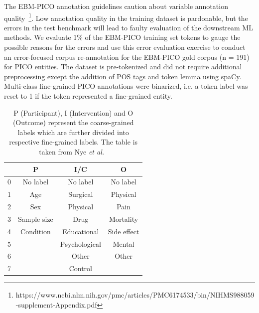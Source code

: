 \documentclass[10.7pt,]{article}
\begin{document}
The EBM-PICO annotation guidelines caution about variable annotation quality~\footnote{https://www.ncbi.nlm.nih.gov/pmc/articles/PMC6174533/bin/NIHMS988059-supplement-Appendix.pdf}.
Low annotation quality in the training dataset is pardonable, but the errors in the test benchmark will lead to faulty evaluation of the downstream ML methods.
We evaluate 1\% of the EBM-PICO training set tokens to gauge the possible reasons for the errors and use this error evaluation exercise to conduct an error-focused corpus re-annotation for the EBM-PICO gold corpus (n = 191) for PICO entities.
The dataset is pre-tokenized and did not require additional preprocessing except the addition of POS tags and token lemma using spaCy.
Multi-class fine-grained PICO annotations were binarized, i.e. a token label was reset to 1 if the token represented a fine-grained entity.
%
%
%
\begin{table}[h!]
\begin{center}
\begin{tabular}{| c | c | c | c |} 
\hline
 & P & I/C & O \\ 
\hline
0 & No label & No label & No label \\ 
1 & Age & Surgical & Physical \\ 
2 & Sex & Physical & Pain \\
3 & Sample size & Drug & Mortality \\
4 & Condition & Educational & Side effect \\
5 &  & Psychological & Mental \\
6 &  & Other & Other \\
7 &  & Control &  \\
\hline
\end{tabular}
\caption{\label{tab:coarsefineconcept} P (Participant), I (Intervention) and O (Outcome) represent the coarse-grained labels which are further divided into respective fine-grained labels. The table is taken from Nye \textit{et al.}~\cite{nye2018corpus}}
\end{center}
\end{table}
%
%
%
\end{document}

